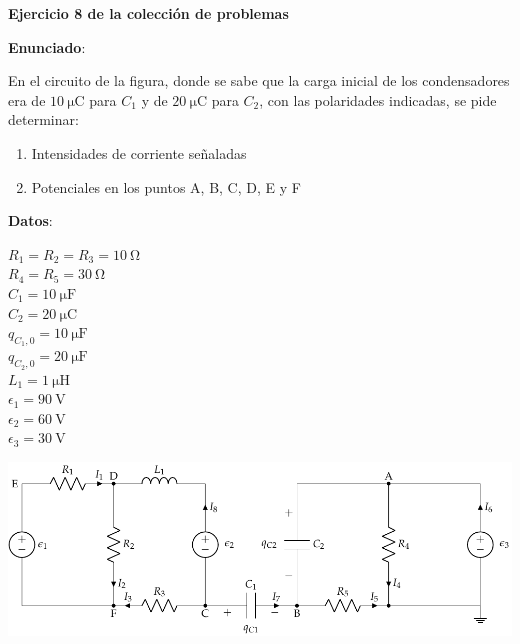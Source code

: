 \documentclass[10pt]{article}
\begin{document}
\large{\textbf{Ejercicio 8 de la colección de problemas}}

\vspace{3mm}
\large{\textbf{Enunciado}}:

\vspace{5mm}

\begin{minipage}{0.65\linewidth}
    \vspace{-24mm}
    En el circuito de la figura, donde se sabe que la carga inicial de los condensadores era de $\qty{10}{\micro\coulomb}$ para $C_1$ y de $\qty{20}{\micro\coulomb}$ para $C_2$, con las polaridades indicadas, se pide determinar:
    
    \begin{enumerate}
        \item Intensidades de corriente señaladas
        \item Potenciales en los puntos A, B, C, D, E y F
    \end{enumerate}
\end{minipage}
\hfill
\begin{minipage}{0.25\linewidth}
    \textbf{Datos}:
    \vspace{2mm}
    
    $R_1 = R_2 = R_3 = \qty{10}{\ohm}$\\
    $R_4 = R_5 = \qty{30}{\ohm}$\\
    $C_1 = \qty{10}{\micro\farad}$\\    
    $C_2 = \qty{20}{\micro\coulomb}$\\
    $q_{C_1,0} = \qty{10}{\micro\farad}$\\
    $q_{C_2,0} = \qty{20}{\micro\farad}$\\
    $L_1 = \qty{1}{\micro\henry}$\\
    $\epsilon_1=\qty{90}{\volt}$\\
    $\epsilon_2 = \qty{60}{\volt}$\\
    $\epsilon_3 = \qty{30}{\volt}$    
\end{minipage}

\includegraphics[scale=1.08]{figs/mallas_carga_inicial.pdf}
\end{document}
